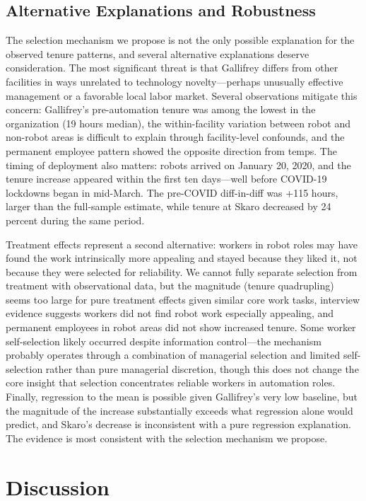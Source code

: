 \documentclass[12pt]{article}
\begin{document}
\subsection{Alternative Explanations and Robustness}

The selection mechanism we propose is not the only possible explanation for the observed tenure patterns, and several alternative explanations deserve consideration. The most significant threat is that Gallifrey differs from other facilities in ways unrelated to technology novelty---perhaps unusually effective management or a favorable local labor market. Several observations mitigate this concern: Gallifrey's pre-automation tenure was among the lowest in the organization (19 hours median), the within-facility variation between robot and non-robot areas is difficult to explain through facility-level confounds, and the permanent employee pattern showed the opposite direction from temps. The timing of deployment also matters: robots arrived on January 20, 2020, and the tenure increase appeared within the first ten days---well before COVID-19 lockdowns began in mid-March. The pre-COVID diff-in-diff was +115 hours, larger than the full-sample estimate, while tenure at Skaro decreased by 24 percent during the same period.

Treatment effects represent a second alternative: workers in robot roles may have found the work intrinsically more appealing and stayed because they liked it, not because they were selected for reliability. We cannot fully separate selection from treatment with observational data, but the magnitude (tenure quadrupling) seems too large for pure treatment effects given similar core work tasks, interview evidence suggests workers did not find robot work especially appealing, and permanent employees in robot areas did not show increased tenure. Some worker self-selection likely occurred despite information control---the mechanism probably operates through a combination of managerial selection and limited self-selection rather than pure managerial discretion, though this does not change the core insight that selection concentrates reliable workers in automation roles. Finally, regression to the mean is possible given Gallifrey's very low baseline, but the magnitude of the increase substantially exceeds what regression alone would predict, and Skaro's decrease is inconsistent with a pure regression explanation. The evidence is most consistent with the selection mechanism we propose.

\section{Discussion}
\end{document}
